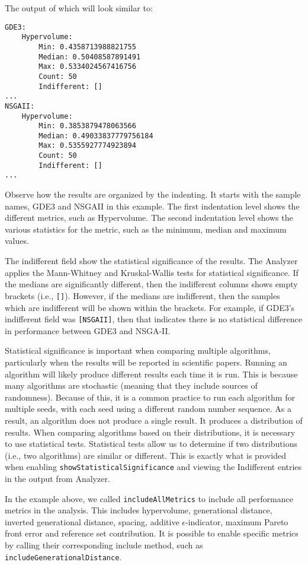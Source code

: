 The output of which will look similar to:

\begin{lstlisting}[language=Plaintext]
GDE3:
    Hypervolume:
        Min: 0.4358713988821755
        Median: 0.50408587891491
        Max: 0.5334024567416756
        Count: 50
        Indifferent: []
...
NSGAII:
    Hypervolume:
        Min: 0.3853879478063566
        Median: 0.49033837779756184
        Max: 0.5355927774923894
        Count: 50
        Indifferent: []
...
\end{lstlisting}

Observe how the results are organized by the indenting.  It starts with the sample names, GDE3 and NSGAII in this example.  The first indentation level shows the different metrics, such as Hypervolume.  The second indentation level shows the various statistics for the metric, such as the minimum, median and maximum values.

The indifferent field show the statistical significance of the results.  The Analyzer applies the Mann-Whitney and Kruskal-Wallis tests for statistical significance.  If the medians are significantly different, then the indifferent columns shows empty brackets (i.e., \texttt{[]}).  However, if the medians are indifferent, then the samples which are indifferent will be shown within the brackets.  For example, if GDE3's indifferent field was \texttt{[NSGAII]}, then that indicates there is no statistical difference in performance between GDE3 and NSGA-II.

Statistical significance is important when comparing multiple algorithms, particularly when the results will be reported in scientific papers.  Running an algorithm will likely produce different results each time it is run.  This is because many algorithms are stochastic (meaning that they include sources of randomness).  Because of this, it is a common practice to run each algorithm for multiple seeds, with each seed using a different random number sequence.  As a result, an algorithm does not produce a single result.  It produces a distribution of results.  When comparing algorithms based on their distributions, it is necessary to use statistical tests.  Statistical tests allow us to determine if two distributions (i.e., two algorithms) are similar or different.  This is exactly what is provided when enabling \texttt{showStatisticalSignificance} and viewing the Indifferent entries in the output from Analyzer.

In the example above, we called \texttt{includeAllMetrics} to include all performance metrics in the analysis.  This includes hypervolume, generational distance, inverted generational distance, spacing, additive $\epsilon$-indicator, maximum Pareto front error and reference set contribution.  It is possible to enable specific metrics by calling their corresponding include method, such as \texttt{includeGenerationalDistance}.

